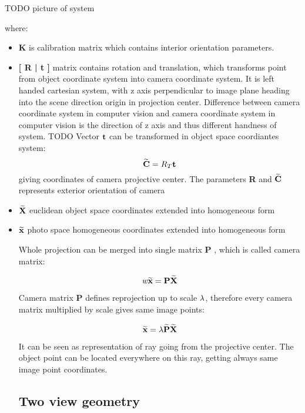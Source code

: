 \documentclass[a4paper,12pt]{report}
\newcommand{\ematr}[1]{
{\bf #1}
}
\newcommand{\evect}[1]{
{\bf #1}
}
\newcommand{\ehvect}[1]{
{\bf \widetilde{#1}}
}
\newcommand{\escal}[1]{
{\it #1}
}
\begin{document}
TODO picture of system

where:

\begin{itemize}
\item \ematr{K} is calibration matrix which contains interior orientation parameters.  
\item \ematr{[\ematr{R}|\evect{t}]} matrix contains rotation and translation, which transforms point from object coordinate system 
	      into camera coordinate system. It is left handed cartesian system, with z axis perpendicular to image plane heading into the scene direction
	      origin in projection center. Difference between camera coordinate 
	      system in computer vision and camera coordinate system in computer vision is the direction 
	      of z axis and thus different handness of system. TODO 
	      Vector $\evect{t}$ can  be transformed in object space coordiantes system:
	      \begin{equation}
	      \ehvect{C} = R_{T}\evect{t}
	      \end{equation}
	      giving coordinates of camera projective center. The parameters \ematr{R} and $\ehvect{C}$
	      represents exterior orientation of camera
	      
\item $\ehvect{X}$ euclidean object space coordinates extended into homogeneous form
\item $\ehvect{x}$ photo space homogeneous coordinates extended into homogeneous form

Whole projection can be merged into single matrix \ematr{P}, which is called camera matrix:

\begin{equation}
\escal{w} \ehvect{x} = \ematr{P} \ehvect{X}
\label{eq:p_abbr}
\end{equation}

Camera matrix \ematr{P} defines reprojection up to scale $\escal{\lambda}$, therefore every camera matrix multiplied by scale gives same image points:

\begin{equation}
\ehvect{x}=\lambda\ehvect{P}\ehvect{X}
 \end{equation}

It can be seen as representation of ray going from the projective center. The object point can be located everywhere on this ray, getting always 
same image point coordinates.

\subsection{Two view geometry}


\end{itemize}
\end{document}
